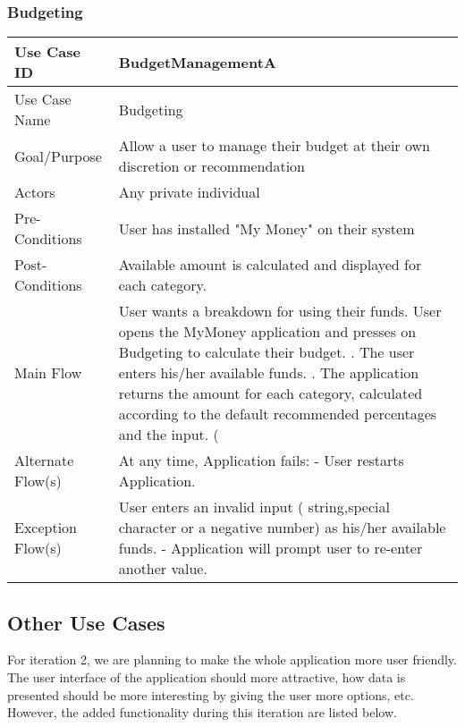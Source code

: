 \documentclass[12pt]{article}
\begin{document}
\subsubsection{Budgeting} \label{uc:3}
\begin{center}
\begin{tabular}{| p{5cm} | p{10cm} |}
\hline

Use Case ID  & BudgetManagementA\\
\hline
Use Case Name  & Budgeting\\
\hline
Goal/Purpose  & Allow a user to manage their budget at their own discretion or recommendation\\
\hline
Actors  & Any private individual\\
\hline
Pre-Conditions &  User has installed "My Money" on their system \\
\hline
Post-Conditions & Available amount is calculated and displayed for each category. \\
\hline
Main Flow & User wants a breakdown for using their funds\newline
1.  User opens the MyMoney application and presses on Budgeting to calculate their budget. \newline
2.  The user enters his/her available funds. \newline
3. The application returns the amount for each category, calculated according to the default recommended percentages and the input. (\newline
\\
\hline
Alternate Flow(s) & 
At any time, Application fails: \newline
   - User restarts Application.
\\
\hline
Exception Flow(s) & User enters an invalid input ( string,special character or a negative number) as his/her available funds. \newline
- Application will prompt user to re-enter another value.\\
\hline

\end{tabular}
\end{center}

\subsection{Other Use Cases}

For iteration 2, we are planning to make the whole application more user friendly. The user interface of the application should more attractive, how data is presented should be more interesting by giving the user more options, etc.
However, the added functionality during this iteration are listed below.
\end{document}
